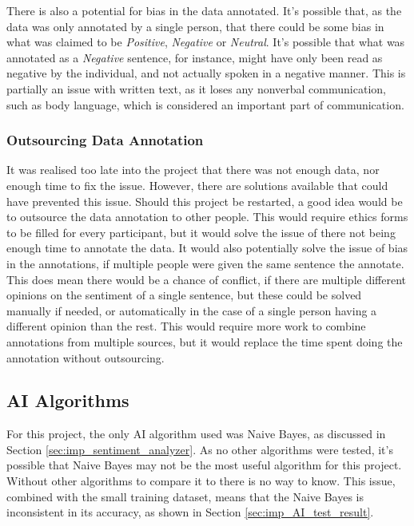 There is also a potential for bias in the data annotated. It's possible that, as the data was only annotated by a single person, that there could be some bias in what was claimed to be \emph{Positive}, \emph{Negative} or \emph{Neutral}. It's possible that what was annotated as a \emph{Negative} sentence, for instance, might have only been read as negative by the individual, and not actually spoken in a negative manner. This is partially an issue with written text, as it loses any nonverbal communication, such as body language, which is considered an important part of communication\cite{Whaley2007}.

\subsubsection{Outsourcing Data Annotation}

It was realised too late into the project that there was not enough data, nor enough time to fix the issue. However, there are solutions available that could have prevented this issue. Should this project be restarted, a good idea would be to outsource the data annotation to other people. This would require ethics forms to be filled for every participant, but it would solve the issue of there not being enough time to annotate the data. It would also potentially solve the issue of bias in the annotations, if multiple people were given the same sentence the annotate. This does mean there would be a chance of conflict, if there are multiple different opinions on the sentiment of a single sentence, but these could be solved manually if needed, or automatically in the case of a single person having a different opinion than the rest. This would require more work to combine annotations from multiple sources, but it would replace the time spent doing the annotation without outsourcing.

\subsection{AI Algorithms}
\label{sec:evl_AI}
For this project, the only AI algorithm used was Naive Bayes, as discussed in Section \ref{sec:imp_sentiment_analyzer}. As no other algorithms were tested, it's possible that Naive Bayes may not be the most useful algorithm for this project. Without other algorithms to compare it to there is no way to know. This issue, combined with the small training dataset, means that the Naive Bayes is inconsistent in its accuracy, as shown in Section \ref{sec:imp_AI_test_result}.

